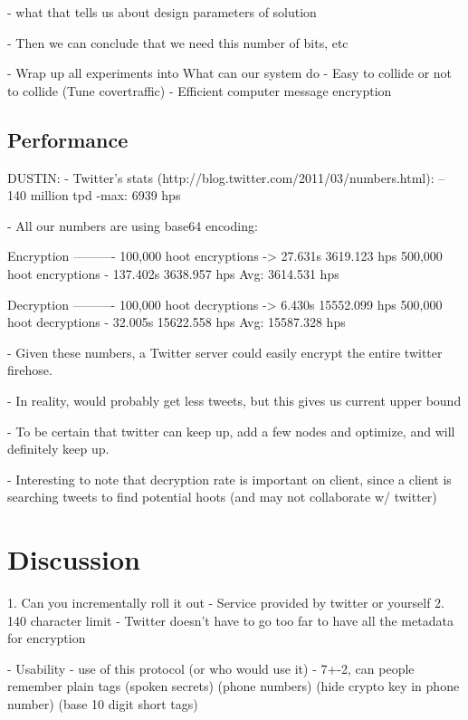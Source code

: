 \documentclass{acm_proc_article-sp}
\begin{document}
- what that tells us about design parameters of solution

- Then we can conclude that we need this number of bits, etc

- Wrap up all experiments into What can our system do
	- Easy to collide or not to collide (Tune covertraffic)
	- Efficient computer message encryption
	




\subsection{Performance}

DUSTIN:
- Twitter's stats (http://blog.twitter.com/2011/03/numbers.html):
	-- 140 million tpd
	-max: 6939 hps
	
- All our numbers are using base64 encoding:

Encryption
----------
100,000 hoot encryptions -> 27.631s        3619.123 hps
500,000 hoot encryptions - 137.402s        3638.957 hps
Avg: 3614.531 hps

Decryption
----------
100,000 hoot decryptions -> 6.430s         15552.099 hps
500,000 hoot decryptions - 32.005s         15622.558 hps
Avg: 15587.328 hps

- Given these numbers, a Twitter server could easily encrypt the entire twitter firehose.

- In reality, would probably get less tweets, but this gives us current upper bound

- To be certain that twitter can keep up, add a few nodes and optimize, and will definitely keep up.

- Interesting to note that decryption rate is important on client, since a client is searching tweets to find potential hoots (and may not collaborate w/ twitter)



\section{Discussion}
1. Can you incrementally roll it out
	- Service provided by twitter or yourself
2. 140 character limit
	- Twitter doesn't have to go too far to have all the metadata for encryption



- Usability
	- use of this protocol (or who would use it)
	- 7+-2, can people remember plain tags (spoken secrets) (phone numbers) (hide crypto key in phone number) (base 10 digit short tags)
	
\end{document}

